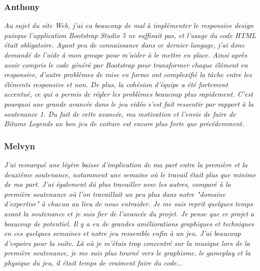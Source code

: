 \documentclass[12pt,a4paper]{article}
\begin{document}
            \subsubsection{Anthony}
                \textit{Au sujet du site Web, j'ai eu beaucoup de mal à implémenter le responsive design
                puisque l'application Bootstrap Studio 5 ne suffisait pas, et l'usage du code HTML était
                obligatoire. Ayant peu de connaissance dans ce dernier langage, j'ai donc demandé
                de l'aide à mon groupe pour m'aider à le mettre en place. Ainsi après avoir compris le
                code généré par Bootstrap pour transformer chaque élément en responsive, d'autre
                problèmes de mise en forme ont complexifié la tâche entre les éléments responsive et
                non. De plus, la cohésion d'équipe a été fortement accentué, ce qui a permis de régler 
                les problèmes beaucoup plus rapidement. C'est pourquoi une grande avancée dans le 
                jeu vidéo s'est fait ressentir par rapport à la soutenance 1. Du fait de cette avancée, 
                ma motivation et l'envie de faire de Bitume Legends un bon jeu de voiture est encore 
                plus forte que précédemment.}

            \subsubsection{Melvyn}
                \textit{J'ai remarqué une légère baisse d'implication de ma part entre la 
                première et la deuxième soutenance, notamment une semaine où le 
                travail était plus que minime de ma part. J'ai également dû plus 
                travailler avec les autres, comparé à la première soutenance où l'on
                travaillait un peu plus dans notre "domaine d'expertise" à chacun 
                au lieu de nous entraider. Je me suis reprit quelques temps avant la
                soutenance et je suis fier de l'avancée du projet. Je pense que ce projet
                a beaucoup de potentiel. Il y a eu de grandes améliorations graphiques et
                techniques en ces quelques semaines et notre jeu ressemble enfin à un jeu.
                J'ai beaucoup d'espoirs pour la suite. Là où je m'étais trop concentré sur
                la musique lors de la première soutenance, je me suis plus tourné vers
                le graphisme, le gameplay et la physique du jeu, il était temps de vraiment
                faire du code...}
\end{document}
